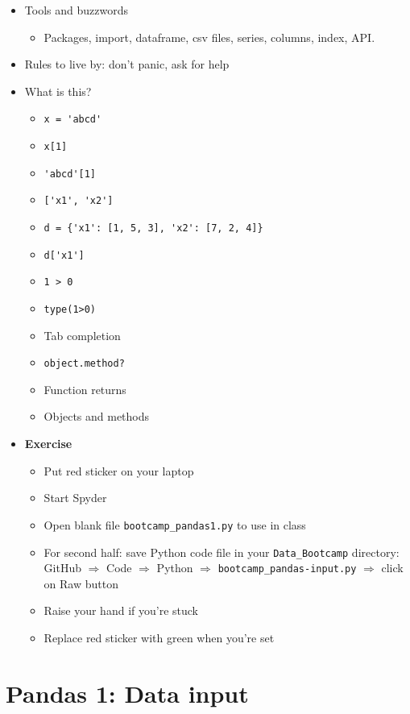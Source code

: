 \begin{itemize}
\item Tools and buzzwords
\begin{itemize}
\item Packages, import, dataframe, csv files, series, columns, index, API.
\end{itemize}

\item Rules to live by:  don't panic, ask for help

\item What is this?
\begin{itemize}
\item \verb|x = 'abcd'|
\item \verb|x[1]|
\item \verb|'abcd'[1]|
\item \verb|['x1', 'x2']|
\item \verb|d = {'x1': [1, 5, 3], 'x2': [7, 2, 4]}|
\item \verb|d['x1']|
\item \verb|1 > 0|
\item \verb|type(1>0)|
\item Tab completion
\item {\tt object.method?}
\item Function returns
\item Objects and methods
\end{itemize}

\item {\bf Exercise}
\begin{itemize}
\item Put red sticker on your laptop
\item Start Spyder
\item Open blank file \verb|bootcamp_pandas1.py| to use in class
\item For second half:  save Python code file in your \verb|Data_Bootcamp| directory: \\
GitHub $\Rightarrow$ Code $\Rightarrow$ Python $\Rightarrow$ \verb|bootcamp_pandas-input.py|
$\Rightarrow$ click on Raw button
\item Raise your hand if you're stuck
\item Replace red sticker with green when you're set
\end{itemize}

\end{itemize}


\section*{Pandas 1: Data input}

